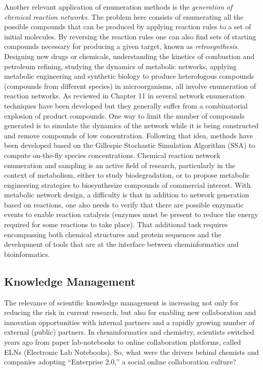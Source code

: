 \documentclass{sig-alternate}
\begin{document}
Another relevant application of enumeration methods is the
\emph{generation of chemical reaction networks}. The problem here
consists of enumerating all the possible compounds that can be
produced by applying reaction rules to a set of initial molecules. By
reversing the reaction rules one can also find sets of starting
compounds necessary for producing a given target, known as
\emph{retrosynthesis}. Designing new drugs or chemicals, understanding
the kinetics of combustion and petroleum refining, studying the
dynamics of metabolic networks, applying metabolic engineering and
synthetic biology to produce heterologous compounds (compounds from
different species) in microorganisms, all involve enumeration of
reaction networks. As reviewed in Chapter 11 in \cite{faulon2010}
several network enumeration techniques have been developed but they
generally suffer from a combinatorial explosion of product
compounds. One way to limit the number of compounds generated is to
simulate the dynamics of the network while it is being constructed and
remove compounds of low concentration. Following that idea, methods
have been developed based on the Gillespie Stochastic Simulation
Algorithm (SSA) to compute on-the-fly species concentrations. Chemical
reaction network enumeration and sampling is an active field of
research, particularly in the context of metabolism, either to study
biodegradation, or to propose metabolic engineering strategies to
biosynthesize compounds of commercial interest. With metabolic network
design, a difficulty is that in addition to network generation based
on reactions, one also needs to verify that there are possible
enzymatic events to enable reaction catalysis (enzymes must be present
to reduce the energy required for some reactions to take place). That
additional task requires encompassing both chemical structures and
protein sequences and the development of tools that are at the
interface between cheminformatics and bioinformatics.


\subsection{Knowledge Management}
\label{sec:knowledge-management}

The relevance of scientific knowledge management is increasing not
only for reducing the risk in current research, but also for enabling
new collaboration and innovation opportunities with internal partners and
a rapidly growing number of external (public) partners. In
cheminformatics and chemistry, scientists switched years ago
from paper lab-notebooks to online collaboration platforms, called
ELNs (Electronic Lab Notebooks). So, what were the drivers behind
chemists and companies adopting ``Enterprise 2.0,'' a social online
collaboration culture?
\end{document}

